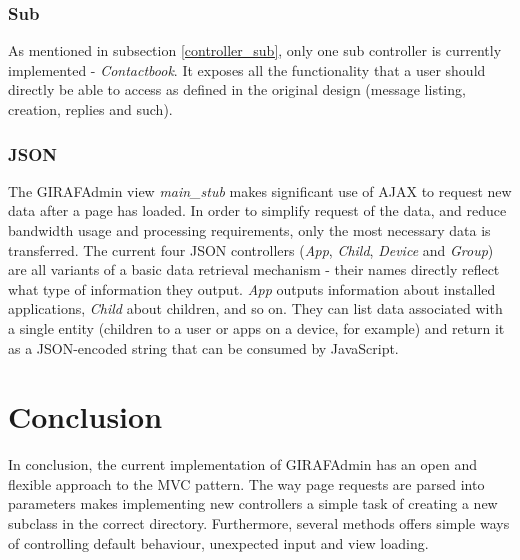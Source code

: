 \subsubsection*{Sub}
As mentioned in subsection \vref{controller_sub}, only one sub controller is currently implemented - \emph{Contactbook}. It exposes all the functionality that a user should directly be able to access as defined in the original design (message listing, creation, replies and such).

\subsubsection*{JSON}
The GIRAFAdmin view \emph{main\_stub} makes significant use of AJAX to request new data after a page has loaded. In order to simplify request of the data, and reduce bandwidth usage and processing requirements, only the most necessary data is transferred. The current four JSON controllers (\emph{App}, \emph{Child}, \emph{Device} and \emph{Group}) are all variants of a basic data retrieval mechanism - their names directly reflect what type of information they output. \emph{App} outputs information about installed applications, \emph{Child} about children, and so on. They can list data associated with a single entity (children to a user or apps on a device, for example) and return it as a JSON-encoded string that can be consumed by JavaScript.

\section{Conclusion}
In conclusion, the current implementation of GIRAFAdmin has an open and flexible approach to the MVC pattern. The way page requests are parsed into parameters makes implementing new controllers a simple task of creating a new subclass in the correct directory. Furthermore, several methods offers simple ways of controlling default behaviour, unexpected input and view loading.
